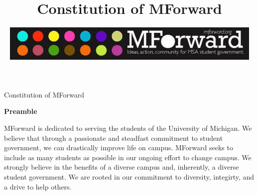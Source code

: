 \documentclass{constitution}
\begin{document}
	\renewcommand{\thepage}{\roman{page}}
	\title{Constitution of MForward}
	\author{\includegraphics[width=5in]{MForwardLogo.jpg}} 
	\maketitle
	\tableofcontents
	\newpage

	\renewcommand{\thepage}{\arabic{page}}
	\setcounter{page}{1}
	\pagestyle{fancy}
	\headheight 35pt
	\linenumbers
	
	\begin{center}
		\Large Constitution of MForward
	\end{center}
	
	\begin{center}
		\bfseries Preamble
	\end{center}

MForward is dedicated to serving the students of the University of Michigan. We believe that through a passionate and steadfast commitment to student government, we can drastically improve life on campus. MForward seeks to include as many students as possible in our ongoing effort to change campus. We strongly believe in the benefits of a diverse campus and, inherently, a diverse student government. We are rooted in our commitment to diversity, integirty, and a drive to help others.












	
\end{document}
